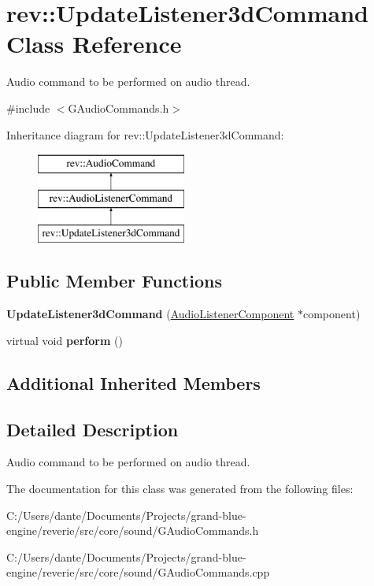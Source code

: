 \hypertarget{classrev_1_1_update_listener3d_command}{}\section{rev\+::Update\+Listener3d\+Command Class Reference}
\label{classrev_1_1_update_listener3d_command}


Audio command to be performed on audio thread.  




{\ttfamily \#include $<$G\+Audio\+Commands.\+h$>$}

Inheritance diagram for rev\+::Update\+Listener3d\+Command\+:\begin{figure}[H]
\begin{center}
\leavevmode
\includegraphics[height=3.000000cm]{classrev_1_1_update_listener3d_command}
\end{center}
\end{figure}
\subsection*{Public Member Functions}
\begin{DoxyCompactItemize}
\item 
\mbox{\label{classrev_1_1_update_listener3d_command_a86a8ab94f6fa8c00a5085a56dc392d11}} 
{\bfseries Update\+Listener3d\+Command} (\mbox{\hyperlink{classrev_1_1_audio_listener_component}{Audio\+Listener\+Component}} $\ast$component)
\item 
\mbox{\label{classrev_1_1_update_listener3d_command_a1cbdf80be1ece01a587a99306e4e677f}} 
virtual void {\bfseries perform} ()
\end{DoxyCompactItemize}
\subsection*{Additional Inherited Members}


\subsection{Detailed Description}
Audio command to be performed on audio thread. 

The documentation for this class was generated from the following files\+:\begin{DoxyCompactItemize}
\item 
C\+:/\+Users/dante/\+Documents/\+Projects/grand-\/blue-\/engine/reverie/src/core/sound/G\+Audio\+Commands.\+h\item 
C\+:/\+Users/dante/\+Documents/\+Projects/grand-\/blue-\/engine/reverie/src/core/sound/G\+Audio\+Commands.\+cpp\end{DoxyCompactItemize}
